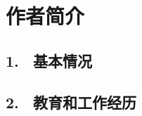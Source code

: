 







\specialsectioning


\chapter{作者简介}
\thispagestyle{others}
\pagestyle{others}
\xiaosi

\section{1. \ 基本情况}

\section{2. \ 教育和工作经历}

